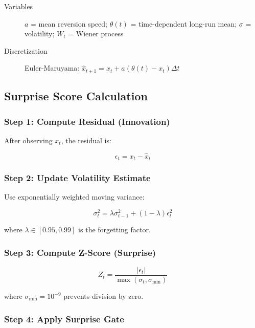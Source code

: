 \begin{description}
  \item[Variables] $a$ = mean reversion speed; $\theta(t)$ = time-dependent long-run mean;
        $\sigma$ = volatility; $W_t$ = Wiener process
  \item[Discretization] Euler-Maruyama: $\hat{x}_{t+1} = x_t + a(\theta(t) - x_t)\Delta t$
\end{description}

\subsection{Surprise Score Calculation}

\subsubsection{Step 1: Compute Residual (Innovation)}

After observing $x_t$, the residual is:

\begin{equation}
\epsilon_t = x_t - \hat{x}_t
\end{equation}

\subsubsection{Step 2: Update Volatility Estimate}

Use exponentially weighted moving variance:

\begin{equation}
\boxed{
\sigma_t^2 = \lambda \sigma_{t-1}^2 + (1-\lambda)\epsilon_t^2
}
\end{equation}

where $\lambda \in [0.95, 0.99]$ is the forgetting factor.

\subsubsection{Step 3: Compute Z-Score (Surprise)}

\begin{equation}
\boxed{
Z_t = \frac{|\epsilon_t|}{\max(\sigma_t, \sigma_{\min})}
}
\end{equation}

where $\sigma_{\min} = 10^{-9}$ prevents division by zero.

\subsubsection{Step 4: Apply Surprise Gate}

